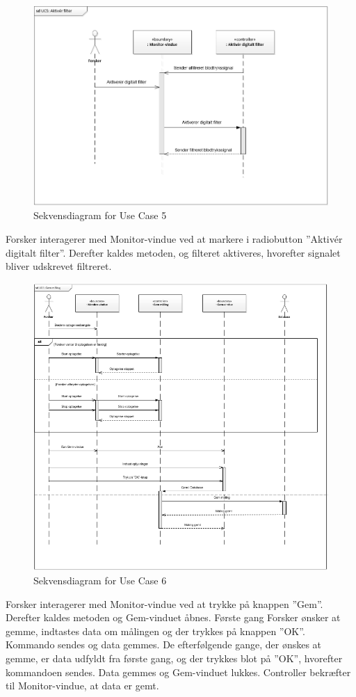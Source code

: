 \begin{figure}[H]
	\centering
	\includegraphics[width=1\textwidth]{Figurer/UC5_SD}
	\caption{Sekvensdiagram for Use Case 5}
\end{figure}

Forsker interagerer med Monitor-vindue ved at markere i radiobutton ”Aktivér digitalt filter”. Derefter kaldes metoden, og filteret aktiveres, hvorefter signalet bliver udskrevet filtreret.

\begin{figure}[H]
	\centering
	\includegraphics[width=1\textwidth]{Figurer/UC6_SD}
	\caption{Sekvensdiagram for Use Case 6}
\end{figure}

Forsker interagerer med Monitor-vindue ved at trykke på knappen ”Gem”. Derefter kaldes metoden og Gem-vinduet åbnes. Første gang Forsker ønsker at gemme, indtastes data om målingen og der trykkes på knappen ”OK”. Kommando sendes og data gemmes. De efterfølgende gange, der ønskes at gemme, er data udfyldt fra første gang, og der trykkes blot på ”OK”, hvorefter kommandoen sendes. Data gemmes og Gem-vinduet lukkes. Controller bekræfter til Monitor-vindue, at data er gemt.
